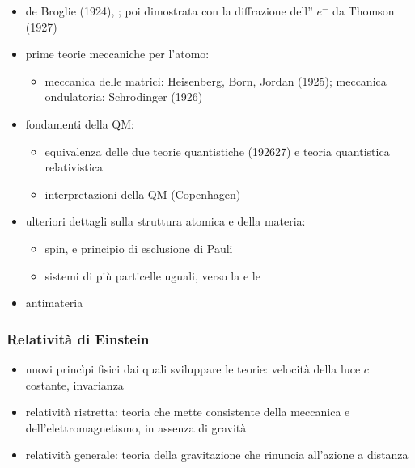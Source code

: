 \documentclass[letterpaper,10pt,italian]{jupyterBook}
\begin{document}
\sphinxAtStartPar
{}
\begin{itemize}
\item {} 
\sphinxAtStartPar
de Broglie (1924), ; poi dimostrata con la diffrazione dell” \(e^-\) da Thomson (1927)

\item {} 
\sphinxAtStartPar
prime teorie meccaniche per l’atomo:
\begin{itemize}
\item {} 
\sphinxAtStartPar
meccanica delle matrici: Heisenberg, Born, Jordan (1925); meccanica ondulatoria: Schrodinger (1926)

\end{itemize}

\item {} 
\sphinxAtStartPar
fondamenti della QM:
\begin{itemize}
\item {} 
\sphinxAtStartPar
equivalenza delle due teorie quantistiche (1926\sphinxhyphen{}27) e teoria quantistica relativistica

\item {} 
\sphinxAtStartPar
interpretazioni della QM (Copenhagen)

\end{itemize}

\item {} 
\sphinxAtStartPar
ulteriori dettagli sulla struttura atomica e della materia:
\begin{itemize}
\item {} 
\sphinxAtStartPar
spin, e principio di esclusione di Pauli

\item {} 
\sphinxAtStartPar
sistemi di più particelle uguali, verso la  e le 

\end{itemize}

\item {} 
\sphinxAtStartPar
antimateria

\end{itemize}


\subsubsection{Relatività di Einstein}
\label{\detokenize{ch/modern:relativita-di-einstein}}\begin{itemize}
\item {} 
\sphinxAtStartPar
nuovi princìpi fisici dai quali sviluppare le teorie: velocità della luce \(c\) costante, invarianza

\item {} 
\sphinxAtStartPar
relatività ristretta: teoria che mette consistente della meccanica e dell’elettromagnetismo, in assenza di gravità

\item {} 
\sphinxAtStartPar
relatività generale: teoria della gravitazione che rinuncia all’azione a distanza

\end{itemize}
\end{document}
